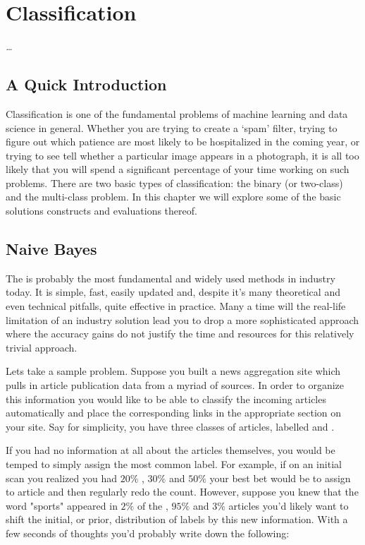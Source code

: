 \chapter[Classification]{Classification} 
\label{chapter:text}
\begin{center}
{\Large\textit{\ldots }}
\end{center}
\vspace{0.2in}

\section{A Quick Introduction}

    Classification is one of the fundamental problems of machine learning and data science in general. Whether you are trying to create a `spam' filter, trying to figure out which patience are most likely to be hospitalized in the coming year, or trying to see tell whether a particular image appears in a photograph, it is all too likely that you will spend a significant percentage of your time working on such problems. There are two basic types of classification: the binary (or two-class) and the multi-class problem. In this chapter we will explore some of the basic solutions constructs and evaluations thereof.

    
\section{Naive Bayes}
\label{NB}


The  is probably the most fundamental and widely used methods in industry today. It is simple, fast, easily updated and, despite it's many theoretical and even technical pitfalls, quite effective in practice. Many a time will the real-life limitation of an industry solution lead you to drop a more sophisticated approach where the accuracy gains do not justify the time and resources for this relatively trivial approach. 


Lets take a sample problem. Suppose you built a news aggregation site which pulls in article publication data from a myriad of sources. In order to organize this information you would like to be able to classify the incoming articles automatically and place the corresponding links in the appropriate section on your site. Say for simplicity, you have three classes of articles, labelled  and . 

If you had no information at all about the articles themselves, you would be temped to simply assign the most common label. For example, if on an initial scan you realized you had $20\%$ , $30\%$  and  $50\%$  your best bet would be to assign  to article and then regularly redo the count. However, suppose you knew that the word "sports" appeared in $2\%$ of the , $95\%$  and  $3\%$  articles you'd likely want to shift the initial, or prior, distribution of labels by this new information. With a few seconds of thoughts you'd probably write down the following:



